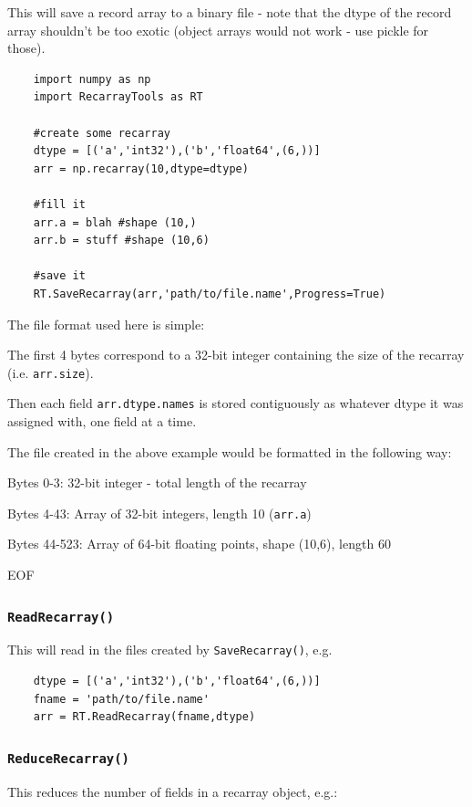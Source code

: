 	This will save a record array to a binary file - note that the dtype of the record array shouldn't be too exotic (object arrays would not work - use pickle for those).
	
	\begin{verbatim}
	import numpy as np
	import RecarrayTools as RT
	
	#create some recarray
	dtype = [('a','int32'),('b','float64',(6,))]
	arr = np.recarray(10,dtype=dtype)
	
	#fill it
	arr.a = blah #shape (10,)
	arr.b = stuff #shape (10,6)
	
	#save it
	RT.SaveRecarray(arr,'path/to/file.name',Progress=True)
	\end{verbatim}
	
	The file format used here is simple:
	
	The first 4 bytes correspond to a 32-bit integer containing the size of the recarray (i.e. \texttt{arr.size}).
	
	Then each field \texttt{arr.dtype.names} is stored contiguously as whatever dtype it was assigned with, one field at a time.
	
	The file created in the above example would be formatted in the following way:
	
	Bytes 0-3: 32-bit integer - total length of the recarray
	
	Bytes 4-43: Array of 32-bit integers, length 10 (\texttt{arr.a})
	
	Bytes 44-523: Array of 64-bit floating points, shape (10,6), length 60
	
	EOF
	
	\subsubsection{\texttt{ReadRecarray()}}
	
	This will read in the files created by \texttt{SaveRecarray()}, e.g.
	
	\begin{verbatim}
	dtype = [('a','int32'),('b','float64',(6,))]
	fname = 'path/to/file.name'
	arr = RT.ReadRecarray(fname,dtype)
	\end{verbatim}
	
	\subsubsection{\texttt{ReduceRecarray()}}
	
	This reduces the number of fields in a recarray object, e.g.:
	
